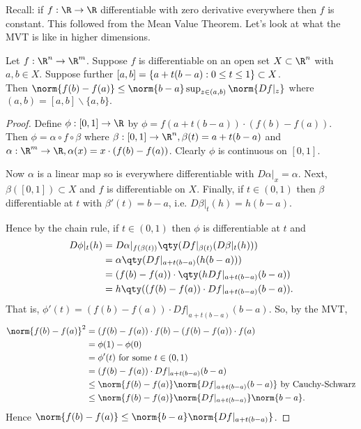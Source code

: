 Recall: if $f: \R\to\R$ differentiable with zero derivative everywhere then $f$ is constant.
This followed from the Mean Value Theorem. 
Let's look at what the MVT is like in higher dimensions.

\begin{theorem} \label{thm:2.7}
    Let $f:\R^n\to\R^m$. Suppose $f$ is differentiable on an open set $X\subset \R^n$ with $a,b\in X$. 
    Suppose further $[a,b] = \{a+t(b-a) : 0\leq t\leq 1\}\subset X$. \\
    Then $\norm{f(b) - f(a)} \leq \norm{b-a} \sup_{z\in(a,b)}\norm{Df|_z}$ where $(a,b) = [a,b] \backslash \{a,b\}.$
\end{theorem}

\begin{proof}
    Define $\phi: [0,1] \to \R$ by $\phi = f(a+t(b-a)) \cdot (f(b)-f(a))$. 
    Then $\phi = \alpha \circ f\circ\beta$ where $\beta:[0,1]\to \R^n,\beta(t) = a+t(b-a)$ and $\alpha: \R^m\to \R, \alpha(x) = x\cdot(f(b) -f(a))$.
    Clearly $\phi$ is continuous on $[0,1]$. 

    Now $\alpha$ is a linear map so is everywhere differentiable with $D\alpha|_x = \alpha$. Next, $\beta([0,1])\subset X$ and $f$ is differentiable on $X$. Finally, if $t\in (0,1)$ then $\beta$ differentiable at $t$ with $\beta'(t) = b-a$, i.e. $D\beta|_t(h) = h(b-a)$. 
    
    Hence by the chain rule, if $t\in (0,1)$ then $\phi$ is differentiable at $t$ and \begin{align*}
        D\phi|_t(h) &= D\alpha|_{f(\beta(t))} \qty(Df|_{\beta(t)} (D\beta|_t(h))) \\
        &= \alpha \qty( Df|_{a+t(b-a)}(h(b-a)) )\\
        &= (f(b)-f(a)) \cdot \qty(h Df|_{a+t(b-a)}(b-a) )\\
        &= h \qty( (f(b)-f(a))\cdot Df|_{a+t(b-a)}(b-a) ).
    \end{align*}
    That is, $\phi'(t) = (f(b)-f(a))\cdot Df|_{a+t(b-a)}(b-a)$. So, by the MVT, 
    \begin{align*}
        \norm{f(b) - f(a)}^2 &= (f(b)-f(a)) \cdot f(b) - (f(b)-f(a)) \cdot f(a)\\
        &= \phi(1) - \phi(0)\\
        &= \phi'(t) \textup{ for some } t\in(0,1)\\
        &= (f(b)-f(a))\cdot Df|_{a+t(b-a)}(b-a)\\
        &\leq \norm{f(b)-f(a)} \norm{Df|_{a+t(b-a)}(b-a)} \textup{ by Cauchy-Schwarz}\\
        &\leq \norm{f(b)-f(a)} \norm{Df|_{a+t(b-a)}} \norm{b-a}.
    \end{align*}
    Hence $\norm{f(b) - f(a)}\leq\norm{b-a} \norm{Df|_{a+t(b-a)}}$.
    \end{proof}

